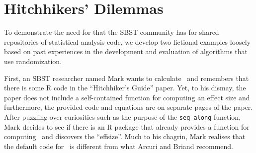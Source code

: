 
\section{Hitchhikers' Dilemmas}
\label{sec:dilemma}

To demonstrate the need for that the SBST community has for shared repositories of statistical analysis code, we develop
two fictional examples loosely based on past experiences in the development and evaluation of algorithms that use
randomization.

First, an SBST researcher named Mark wants to calculate \atwelve~and remembers that there is some R code in the
``Hitchhiker's Guide'' paper. Yet, to his dismay, the paper does not include a self-contained function for computing
an effect size and furthermore, the provided code and equations are on separate pages of the paper. After puzzling over
curiosities such as the purpose of the {\tt seq\_along} function, Mark decides to see if there is an R package that
already provides a function for computing \atwelve~and discovers the ``effsize''. Much to his chagrin, Mark realises
that the default code for \atwelve~is different from what Arcuri and Briand recommend.


